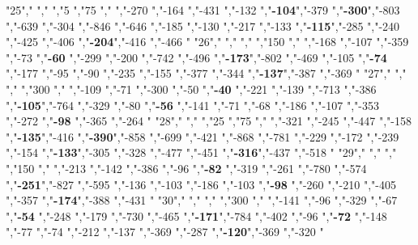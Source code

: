 "25","        ","     ","5   ","75  ","     ","-270          ","-164          ","-431          ","-132          ","\textbf{-104}","-379          ","\textbf{-300}","-803          ","-639          ","-304          ","-846          ","-646          ","-185          ","-130          ","-217          ","-133          ","\textbf{-115}","-285          ","-240          ","-425          ","-406          ","\textbf{-204}","-416          ","-466          "
"26","        ","     ","    ","150 ","     ","-168          ","-107          ","-359          ","-73           ","\textbf{-60} ","-299          ","-200          ","-742          ","-496          ","\textbf{-173}","-802          ","-469          ","-105          ","\textbf{-74} ","-177          ","-95           ","-90           ","-235          ","-155          ","-377          ","-344          ","\textbf{-137}","-387          ","-369          "
"27","        ","     ","    ","300 ","     ","-109          ","-71           ","-300          ","-50           ","\textbf{-40} ","-221          ","-139          ","-713          ","-386          ","\textbf{-105}","-764          ","-329          ","-80           ","\textbf{-56} ","-141          ","-71           ","-68           ","-186          ","-107          ","-353          ","-272          ","\textbf{-98} ","-365          ","-264          "
"28","        ","     ","25  ","75  ","     ","-321          ","-245          ","-447          ","-158          ","\textbf{-135}","-416          ","\textbf{-390}","-858          ","-699          ","-421          ","-868          ","-781          ","-229          ","-172          ","-239          ","-154          ","\textbf{-133}","-305          ","-328          ","-477          ","-451          ","\textbf{-316}","-437          ","-518          "
"29","        ","     ","    ","150 ","     ","-213          ","-142          ","-386          ","-96           ","\textbf{-82} ","-319          ","-261          ","-780          ","-574          ","\textbf{-251}","-827          ","-595          ","-136          ","-103          ","-186          ","-103          ","\textbf{-98} ","-260          ","-210          ","-405          ","-357          ","\textbf{-174}","-388          ","-431          "
"30","        ","     ","    ","300 ","     ","-141          ","-96           ","-329          ","-67           ","\textbf{-54} ","-248          ","-179          ","-730          ","-465          ","\textbf{-171}","-784          ","-402          ","-96           ","\textbf{-72} ","-148          ","-77           ","-74           ","-212          ","-137          ","-369          ","-287          ","\textbf{-120}","-369          ","-320          "
